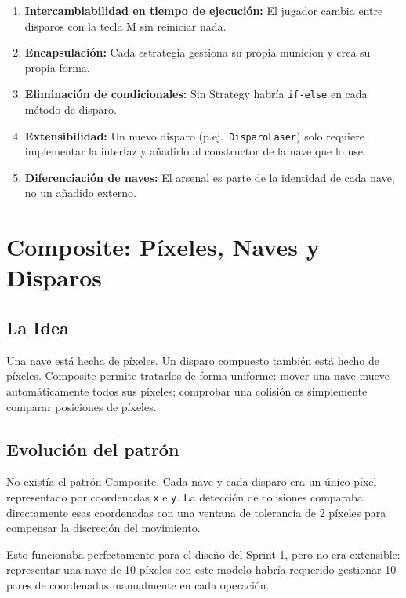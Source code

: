 \documentclass[12pt, a4paper]{article}
\begin{document}
\begin{enumerate}
    \item \textbf{Intercambiabilidad en tiempo de ejecuci\'{o}n:} El jugador cambia entre disparos con la tecla M sin reiniciar nada.
    \item \textbf{Encapsulaci\'{o}n:} Cada estrategia gestiona su propia municion y crea su propia forma.
    \item \textbf{Eliminaci\'{o}n de condicionales:} Sin Strategy habr\'{i}a \texttt{if-else} en cada m\'{e}todo de disparo.
    \item \textbf{Extensibilidad:} Un nuevo disparo (p.ej.\ \texttt{DisparoLaser}) solo requiere implementar la interfaz y a\~{n}adirlo al constructor de la nave que lo use.
    \item \textbf{Diferenciaci\'{o}n de naves:} El arsenal es parte de la identidad de cada nave, no un a\~{n}adido externo.
\end{enumerate}
 
\section{Composite: P\'{i}xeles, Naves y Disparos}
 
\subsection{La Idea}
 
Una nave est\'{a} hecha de p\'{i}xeles. Un disparo compuesto tambi\'{e}n est\'{a} hecho de p\'{i}xeles. Composite permite tratarlos de forma uniforme: mover una nave mueve autom\'{a}ticamente todos sus p\'{i}xeles; comprobar una colisi\'{o}n es simplemente comparar posiciones de p\'{i}xeles.
 
\subsection{Evoluci\'{o}n del patr\'{o}n}
 
\begin{cajasprint1}
No exist\'{i}a el patr\'{o}n Composite. Cada nave y cada disparo era un \'{u}nico p\'{i}xel representado por coordenadas \texttt{x} e \texttt{y}. La detecci\'{o}n de colisiones comparaba directamente esas coordenadas con una ventana de tolerancia de 2 p\'{i}xeles para compensar la discreci\'{o}n del movimiento.
 
Esto funcionaba perfectamente para el dise\~{n}o del Sprint 1, pero no era extensible: representar una nave de 10 p\'{i}xeles con este modelo habr\'{i}a requerido gestionar 10 pares de coordenadas manualmente en cada operaci\'{o}n.
\end{cajasprint1}
 
\end{document}
